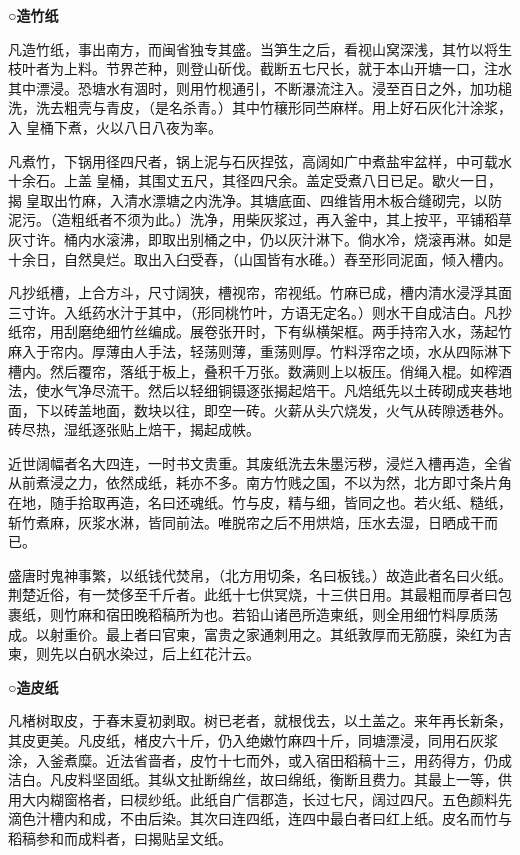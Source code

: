 \documentclass[]{article}
\begin{document}
\textbf{○造竹纸}

凡造竹纸，事出南方，而闽省独专其盛。当笋生之后，看视山窝深浅，其竹以将生枝叶者为上料。节界芒种，则登山斫伐。截断五七尺长，就于本山开塘一口，注水其中漂浸。恐塘水有涸时，则用竹枧通引，不断瀑流注入。浸至百日之外，加功槌洗，洗去粗壳与青皮，（是名杀青。）其中竹穰形同苎麻样。用上好石灰化汁涂浆，入皇桶下煮，火以八日八夜为率。

凡煮竹，下锅用径四尺者，锅上泥与石灰捏弦，高阔如广中煮盐牢盆样，中可载水十余石。上盖皇桶，其围丈五尺，其径四尺余。盖定受煮八日已足。歇火一日，揭皇取出竹麻，入清水漂塘之内洗净。其塘底面、四维皆用木板合缝砌完，以防泥污。（造粗纸者不须为此。）洗净，用柴灰浆过，再入釜中，其上按平，平铺稻草灰寸许。桶内水滚沸，即取出别桶之中，仍以灰汁淋下。倘水冷，烧滚再淋。如是十余日，自然臭烂。取出入臼受舂，（山国皆有水碓。）舂至形同泥面，倾入槽内。

凡抄纸槽，上合方斗，尺寸阔狭，槽视帘，帘视纸。竹麻已成，槽内清水浸浮其面三寸许。入纸药水汁于其中，（形同桃竹叶，方语无定名。）则水干自成洁白。凡抄纸帘，用刮磨绝细竹丝编成。展卷张开时，下有纵横架框。两手持帘入水，荡起竹麻入于帘内。厚薄由人手法，轻荡则薄，重荡则厚。竹料浮帘之顷，水从四际淋下槽内。然后覆帘，落纸于板上，叠积千万张。数满则上以板压。俏绳入棍。如榨酒法，使水气净尽流干。然后以轻细铜镊逐张揭起焙干。凡焙纸先以土砖砌成夹巷地面，下以砖盖地面，数块以往，即空一砖。火薪从头穴烧发，火气从砖隙透巷外。砖尽热，湿纸逐张贴上焙干，揭起成帙。

近世阔幅者名大四连，一时书文贵重。其废纸洗去朱墨污秽，浸烂入槽再造，全省从前煮浸之力，依然成纸，耗亦不多。南方竹贱之国，不以为然，北方即寸条片角在地，随手拾取再造，名曰还魂纸。竹与皮，精与细，皆同之也。若火纸、糙纸，斩竹煮麻，灰浆水淋，皆同前法。唯脱帘之后不用烘焙，压水去湿，日晒成干而已。

盛唐时鬼神事繁，以纸钱代焚帛，（北方用切条，名曰板钱。）故造此者名曰火纸。荆楚近俗，有一焚侈至千斤者。此纸十七供冥烧，十三供日用。其最粗而厚者曰包裹纸，则竹麻和宿田晚稻稿所为也。若铅山诸邑所造柬纸，则全用细竹料厚质荡成。以射重价。最上者曰官柬，富贵之家通刺用之。其纸敦厚而无筋膜，染红为吉柬，则先以白矾水染过，后上红花汁云。

\textbf{○造皮纸}

凡楮树取皮，于春末夏初剥取。树已老者，就根伐去，以土盖之。来年再长新条，其皮更美。凡皮纸，楮皮六十斤，仍入绝嫩竹麻四十斤，同塘漂浸，同用石灰浆涂，入釜煮糜。近法省啬者，皮竹十七而外，或入宿田稻稿十三，用药得方，仍成洁白。凡皮料坚固纸。其纵文扯断绵丝，故曰绵纸，衡断且费力。其最上一等，供用大内糊窗格者，曰棂纱纸。此纸自广信郡造，长过七尺，阔过四尺。五色颜料先滴色汁槽内和成，不由后染。其次曰连四纸，连四中最白者曰红上纸。皮名而竹与稻稿参和而成料者，曰揭贴呈文纸。
\end{document}
